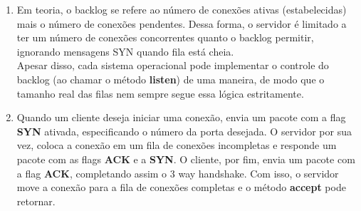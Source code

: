\documentclass[12pt,a4paper]{report}
\begin{document}
\begin{enumerate}
    \item Em teoria, o backlog se refere ao número de conexões ativas (estabelecidas) mais o número de conexões pendentes. Dessa forma, o servidor é limitado a ter um número de conexões concorrentes quanto o backlog permitir, ignorando mensagens SYN quando fila está cheia.
    \\
    Apesar disso, cada sistema operacional pode implementar o controle do backlog (ao chamar o método \textbf{listen}) de uma maneira, de modo que o tamanho real das filas nem sempre segue essa lógica estritamente.
    
    \item Quando um cliente deseja iniciar uma conexão, envia um pacote com a flag \textbf{SYN} ativada, especificando o número da porta desejada. O servidor por sua vez, coloca a conexão em um fila de conexões incompletas e responde um pacote com as flags \textbf{ACK} e a \textbf{SYN}. O cliente, por fim, envia um pacote com a flag \textbf{ACK}, completando assim o 3 way handshake. Com isso, o servidor move a conexão para a fila de conexões completas e o método \textbf{accept} pode retornar.
     

\end{enumerate}
\end{document}
